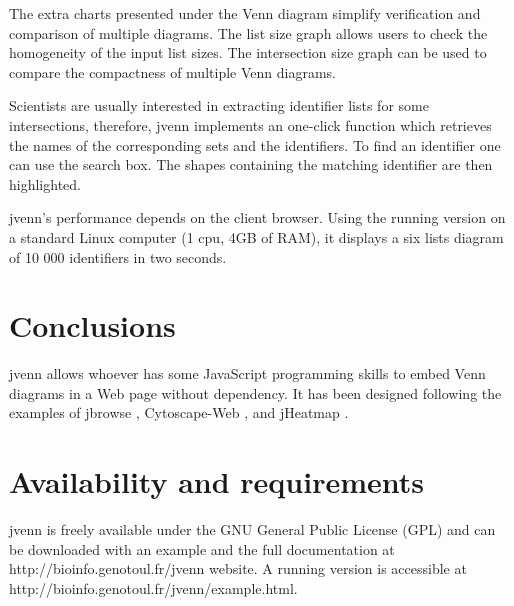 \documentclass{bmcart}
\begin{document}
The extra charts presented under the Venn diagram simplify verification and
comparison of multiple diagrams. The list size graph allows users to check the
homogeneity of the input list sizes. The intersection size graph can be used to
compare the compactness of multiple Venn diagrams.

Scientists are usually interested in extracting identifier lists for some intersections, 
therefore, jvenn implements an one-click function which
retrieves the names of the corresponding sets and the identifiers. To find an 
identifier one can use the search box. The shapes containing the
matching identifier are then highlighted.

jvenn's performance depends on the client browser. Using the running version
on a standard Linux computer (1 cpu, 4GB of RAM), it displays a six lists diagram of 
10 000 identifiers in two seconds.

\section*{Conclusions}

jvenn allows whoever has some JavaScript programming skills to embed Venn
diagrams in a Web page without dependency. It has been designed following the
examples of jbrowse \cite{Westesson01032013}, Cytoscape-Web \cite{Lopes2010},
and jHeatmap \cite{DeuPons2014}.

\section*{Availability and requirements}

jvenn is freely available under the GNU General Public License (GPL) and can be
downloaded with an example and the full documentation at
http://bioinfo.genotoul.fr/jvenn  website. A running version is accessible at
http://bioinfo.genotoul.fr/jvenn/example.html.

\end{document}
